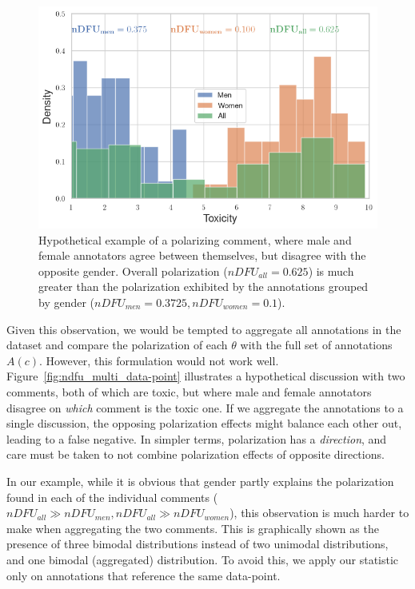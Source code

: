 \documentclass{article}
\begin{document}
\begin{figure}
	\centering
	\includegraphics[width=0.8\linewidth]{ndfu_combined.png}
	\caption{Hypothetical example of a polarizing comment, where male and female annotators agree between themselves, but disagree with the opposite gender. Overall polarization ($nDFU_{all} = 0.625$) is much greater than the polarization exhibited by the annotations grouped by gender ($nDFU_{men} = 0.3725, nDFU_{women} = 0.1$). %
    }
	\label{fig:ndfu_single_data-point}
\end{figure}

Given this observation, we would be tempted to aggregate all annotations in the dataset and compare the polarization of each $\theta$ with the full set of annotations $A(c)$. However, this formulation would not work well. Figure~\ref{fig:ndfu_multi_data-point} illustrates a hypothetical discussion with two comments, both of which are toxic, but where male and female annotators disagree on \emph{which} comment is the toxic one. If we aggregate the annotations to a single discussion, the opposing polarization effects might balance each other out, leading to a false negative. In simpler terms, polarization has a \textit{direction}, and care must be taken to not combine polarization effects of opposite directions.

In our example, while it is obvious that gender partly explains the polarization found in each of the individual comments ($nDFU_{all} \gg nDFU_{men}, nDFU_{all} \gg nDFU_{women}$), this observation is much harder to make when aggregating the two comments. This is graphically shown as the presence of three bimodal distributions instead of two unimodal distributions, and one bimodal (aggregated) distribution. To avoid this, we apply our statistic only on annotations that reference the same data-point.
\end{document}
